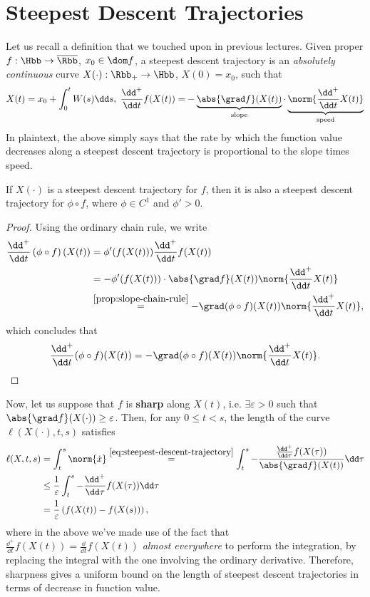 \section{Steepest Descent Trajectories}

Let us recall a definition that we touched upon in previous lectures. Given
proper $f: \Hbb \to \overline{\Rbb}$, $x_0 \in \dom f$, a steepest descent
trajectory is an \textit{absolutely continuous} curve $X(\cdot): \Rbb_+ \to
\Hbb$, $X(0) = x_0$, such that
\begin{equation}
	X(t) = x_0 + \int_0^t W(s) \dd s, \;
	\frac{\dd^+}{\dd t} f(X(t)) = -
	\underbrace{\abs{\grad f}(X(t))}_{\text{slope}} \cdot
	\underbrace{\norm{ \frac{\dd^+}{\dd t} X(t) }}_{\text{speed}}
	\label{eq:steepest-descent-trajectory}
\end{equation}
In plaintext, the above simply says that the rate by which the function value
decreases along a steepest descent trajectory is proportional to the slope
times speed.

\begin{cproposition}{}{}
	If $X(\cdot)$ is a steepest descent trajectory for $f$, then it is also a
	steepest descent trajectory for $\phi \circ f$, where $\phi \in C^1$ and
	$\phi' > 0$.
\end{cproposition}
\begin{proof}
	Using the ordinary chain rule, we write
	\begin{align*}
		\frac{\dd^+}{\dd t} \left(\phi \circ f\right)(X(t)) &=
			\phi'(f(X(t))) \frac{\dd^+}{\dd t} f(X(t)) \\
			&= -\phi'(f(X(t))) \cdot \abs{\grad f}(X(t))
			   \norm{\frac{\dd^+}{\dd t} X(t)} \\
			&\overset{\cref{prop:slope-chain-rule}}{=}
			-\grad(\phi \circ f)(X(t)) \norm{\frac{\dd^+}{\dd t} X(t)},
	\end{align*}
	which concludes that
	\[
		\frac{\dd^+}{\dd t} (\phi \circ f)(X(t))
		= -\grad (\phi \circ f)(X(t)) \norm{\frac{\dd^+}{\dd t} X(t)}.
	\]
\end{proof}

Now, let us suppose that $f$ is \textbf{sharp} along $X(t)$, i.e. $\exists
\varepsilon > 0$ such that $\abs{\grad f}(X(\cdot)) \geq \varepsilon$. Then,
for any $0 \leq t < s$, the length of the curve $\ell(X(\cdot), t, s)$ satisfies
\begin{align*}
	\ell(X, t, s) &= \int_t^s \norm{\dot{x}}
	\overset{\cref{eq:steepest-descent-trajectory}}{=}
	\int_t^s -\frac{\frac{\dd^+}{\dd \tau} f(X(\tau))}{\abs{\grad f}(X(t))}
		\dd \tau \\
		&\leq \frac{1}{\varepsilon} \int_t^s
			-\frac{\dd^+}{\dd \tau} f(X(\tau)) \dd \tau \\
		&=\frac{1}{\varepsilon} \left(f(X(t)) - f(X(s))\right),
\end{align*}
where in the above we've made use of the fact that $\frac{\dd^+}{\dd t} f(X(t))
= \frac{\dd}{\dd t} f(X(t))$ \textit{almost everywhere} to perform the
integration, by replacing the integral with the one involving the ordinary
derivative.
Therefore, sharpness gives a uniform bound on the length of steepest descent
trajectories in terms of decrease in function value.

